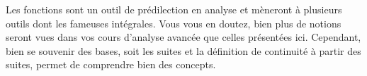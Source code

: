 \documentclass[oneside,12pt,french,table]{book}
\theoremstyle{definition}
\theoremstyle{plain}
\theoremstyle{remark}
\begin{document}
Les fonctions sont un outil de prédilection en analyse et mèneront à plusieurs outils dont les fameuses intégrales. Vous vous en doutez, bien plus de notions seront vues dans vos cours d'analyse avancée que celles présentées ici. Cependant, bien se souvenir des bases, soit les suites et la définition de continuité à partir des suites, permet de comprendre bien des concepts. 
\end{document}

